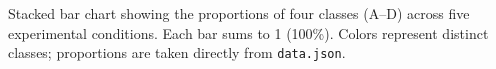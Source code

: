 \caption{Stacked bar chart showing the proportions of four classes (A--D) across five experimental conditions. Each bar sums to 1 (100\%). Colors represent distinct classes; proportions are taken directly from \texttt{data.json}.}
